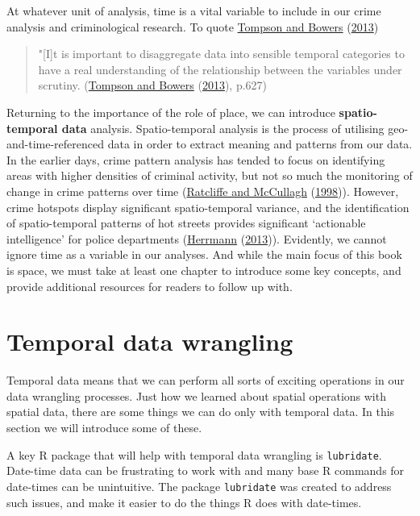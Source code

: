 \documentclass[
  krantz2]{krantz}
\begin{document}
At whatever unit of analysis, time is a vital variable to include in our crime analysis and criminological research. To quote \protect\hyperlink{ref-Tompson_2013}{Tompson and Bowers} (\protect\hyperlink{ref-Tompson_2013}{2013})

\begin{quote}
"{[}I{]}t is important to disaggregate data into sensible temporal categories to have a real understanding of the relationship between the variables under scrutiny. (\protect\hyperlink{ref-Tompson_2013}{Tompson and Bowers} (\protect\hyperlink{ref-Tompson_2013}{2013}), p.627)
\end{quote}

Returning to the importance of the role of place, we can introduce \textbf{spatio-temporal data} analysis. Spatio-temporal analysis is the process of utilising geo-and-time-referenced data in order to extract meaning and patterns from our data. In the earlier days, crime pattern analysis has tended to focus on identifying areas with higher densities of criminal activity, but not so much the monitoring of change in crime patterns over time (\protect\hyperlink{ref-Ratcliffe_1998}{Ratcliffe and McCullagh} (\protect\hyperlink{ref-Ratcliffe_1998}{1998})). However, crime hotspots display significant spatio-temporal variance, and the identification of spatio-temporal patterns of hot streets provides significant `actionable intelligence' for police departments (\protect\hyperlink{ref-Herrmann_2013}{Herrmann} (\protect\hyperlink{ref-Herrmann_2013}{2013})). Evidently, we cannot ignore time as a variable in our analyses. And while the main focus of this book is space, we must take at least one chapter to introduce some key concepts, and provide additional resources for readers to follow up with.

\hypertarget{temporal-data-wrangling}{%
\section{Temporal data wrangling}\label{temporal-data-wrangling}}

Temporal data means that we can perform all sorts of exciting operations in our data wrangling processes. Just how we learned about spatial operations with spatial data, there are some things we can do only with temporal data. In this section we will introduce some of these.

A key R package that will help with temporal data wrangling is \texttt{lubridate}. Date-time data can be frustrating to work with and many base R commands for date-times can be unintuitive. The package \texttt{lubridate} was created to address such issues, and make it easier to do the things R does with date-times.
\end{document}
